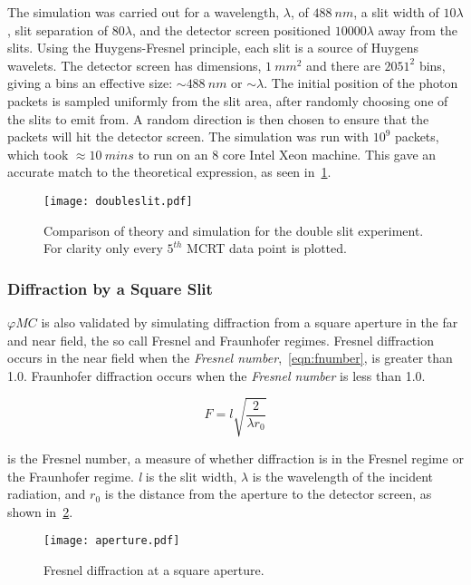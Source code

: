 The simulation was carried out for a wavelength, $\lambda$,  of $488~nm$, a slit width of $10\lambda$, slit separation of $80\lambda$, and the detector screen positioned $10000\lambda$ away from the slits.
Using the Huygens-Fresnel principle, each slit is a source of Huygens wavelets.
The detector screen has dimensions, $1~mm^2$ and there are $2051^2$ bins, giving a bins an effective size: $\sim 488~nm$ or $\sim \lambda$.
The initial position of the photon packets is sampled uniformly from the slit area, after randomly choosing one of the slits to emit from.
A random direction is then chosen to ensure that the packets will hit the detector screen.
The simulation was run with $10^9$ packets, which took $\approx10~mins$ to run on an 8 core Intel Xeon machine.
This gave an accurate match to the theoretical expression, as seen in~\cref{fig:doubleslitcomp}.

\begin{figure}[!ht]
    \centering
    \texttt{[image: doubleslit.pdf]}
    \caption{Comparison of theory and simulation for the double slit experiment. For clarity only every $5^{th}$ MCRT data point is plotted.}
    \label{fig:doubleslitcomp}
\end{figure}

\subsubsection*{Diffraction by a Square Slit}
$\varphi MC$ is also validated by simulating diffraction from a square aperture in the far and near field, the so call Fresnel and Fraunhofer regimes. 
Fresnel diffraction occurs in the near field when the \textit{Fresnel number},~\cref{eqn:fnumber}, is greater than 1.0.
Fraunhofer diffraction occurs when the \textit{Fresnel number} is less than 1.0.

\begin{equation}
F = l\sqrt{\frac{2}{\lambda r_0}}
\label{eqn:fnumber}
\end{equation}

 is the Fresnel number, a measure of whether diffraction is in the Fresnel regime or the Fraunhofer regime.
\textit{l} is the slit width, $\lambda$ is the wavelength of the incident radiation, and $r_0$ is the distance from the aperture to the detector screen, as shown in~\cref{fig:aperture}. 

\medskip
\begin{figure}[!ht]
    \centering
    \texttt{[image: aperture.pdf]}
    \caption{Fresnel diffraction at a square aperture.}
    \label{fig:aperture}
\end{figure}

